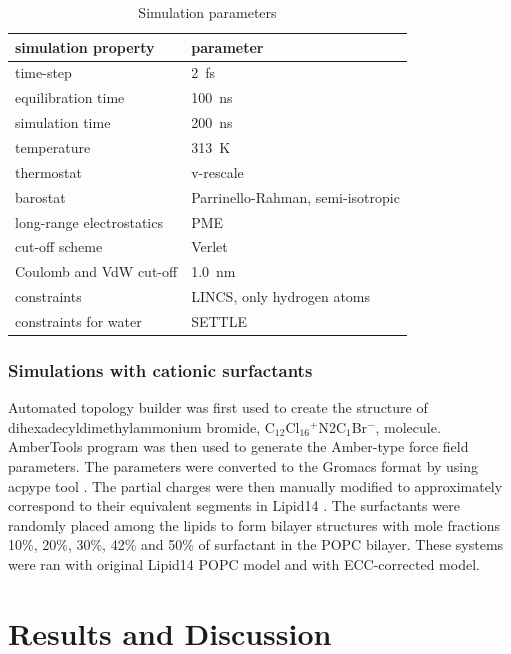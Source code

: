 \documentclass[aip,jcp,twocolumn]{revtex4}
\begin{document}
\begin{table}[btp]
  \caption{Simulation parameters}
  \label{tbl:mdpar}
  \begin{tabular}{ll}
    simulation property & parameter   \\
    \hline
    time-step           & 2~fs         \\
    equilibration time  & 100~ns  \\
    simulation time     & 200~ns  \\
    temperature         & 313~K       \\
    thermostat          & v-rescale  \cite{bussi07}   \\
    barostat            & Parrinello-Rahman, semi-isotropic \cite{parrinello81} \\
    long-range electrostatics & PME  \cite{darden93}  \\
    cut-off scheme      & Verlet \cite{Pall13}      \\
    Coulomb and VdW cut-off & 1.0~nm \\
    constraints         & LINCS, only hydrogen atoms \cite{hess97} \\
    constraints for water & SETTLE  \cite{miyamoto92} \\
    \hline
  \end{tabular}
\end{table}


\subsubsection{Simulations with cationic surfactants}
Automated topology builder \cite{malde11} was first used to create the structure of
dihexadecyldimethylammonium bromide, C$_{12}$Cl$_{16}$$^+$N2C$_1$Br$^-$, molecule.
AmberTools program \cite{amber} was then used to generate the Amber-type force field
parameters. The parameters were converted to the Gromacs format by using
acpype tool \cite{acpype}. The partial charges were then manually modified
to approximately correspond to their equivalent segments in Lipid14 \cite{dickson14}.
The surfactants were randomly placed among the lipids to form bilayer structures with
mole fractions 10\%, 20\%, 30\%, 42\% and 50\% of surfactant in the POPC bilayer.
These systems were ran with original Lipid14 POPC model and with ECC-corrected model.

\section{Results and Discussion}
\end{document}
